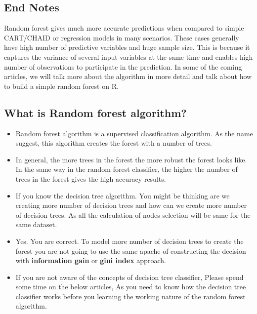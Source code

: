 \documentclass[a4paper,12pt]{article}
\begin{document}
\subsection*{End Notes}
Random forest gives much more accurate predictions when compared to simple CART/CHAID or regression models in many scenarios. These cases generally have high number of predictive variables and huge sample size. This is because it captures the variance of several input variables at the same time and enables high number of observations to participate in the prediction. In some of the coming articles, we will talk more about the algorithm in more detail and talk about how to build a simple random forest on R.


\subsection*{What is Random forest algorithm?}
\begin{itemize}
	\item Random forest algorithm is a supervised classification algorithm. As the name suggest, this algorithm creates the forest with a number of trees.
	
	\item In general, the more trees in the forest the more robust the forest looks like. In the same way in the random forest classifier, the higher the number of trees in the forest gives the high accuracy results.
	
	\item If you know the decision tree algorithm. You might be thinking are we creating more number of decision trees and how can we create more number of decision trees. As all the calculation of nodes selection will be same for the same dataset.
	
	\item Yes. You are correct. To model more number of decision trees to create the forest you are not going to use the same apache of constructing the decision with \textbf{information gain} or \textbf{gini index} approach.
	
	\item If you are not aware of the concepts of decision tree classifier, Please spend some time on the below articles, As you need to know how the decision tree classifier works before you learning the working nature of the random forest algorithm. 
	
\end{itemize}

%
%
%
%
%
\end{document}
